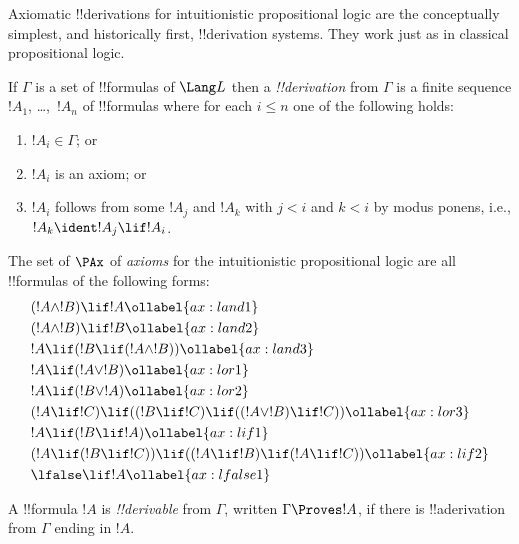 \documentclass[../../../include/open-logic-section]{subfiles}
\begin{document}


Axiomatic !!{derivation}s for intuitionistic propositional logic are
the conceptually simplest, and historically first, !!{derivation}
systems. They work just as in classical propositional logic.

\begin{defn}[!!^{derivability}]
If $\Gamma$ is a set of !!{formula}s of $\Lang L$ then a
\emph{!!{derivation}} from $\Gamma$ is a finite sequence $!A_1$,
\dots,~$!A_n$ of !!{formula}s where for each $i \le n$ one of the
following holds:
\begin{enumerate}
\item $!A_i \in \Gamma$; or
\item $!A_i$ is an axiom; or
\item $!A_i$ follows from some $!A_j$ and $!A_k$ with $j < i$ and $k <
  i$ by modus ponens, i.e., $!A_k \ident !A_j \lif !A_i$.
\end{enumerate}
\end{defn}

\begin{defn}[Axioms]
The set of $\PAx$ of \emph{axioms} for the intuitionistic propositional logic 
are all !!{formula}s of the following forms:
\begin{align}
  & (!A \land !B) \lif !A \ollabel{ax:land1}\\
  & (!A \land !B) \lif !B \ollabel{ax:land2}\\
  & !A \lif (!B \lif (!A \land !B)) \ollabel{ax:land3}\\
  & !A \lif (!A \lor !B) \ollabel{ax:lor1}\\
  & !A \lif (!B \lor !A) \ollabel{ax:lor2}\\
  & (!A \lif !C) \lif ((!B \lif !C) \lif ((!A \lor !B) \lif !C)) \ollabel{ax:lor3}\\
  & !A \lif (!B \lif !A) \ollabel{ax:lif1}\\
  & (!A \lif (!B \lif !C)) \lif ((!A \lif !B) \lif (!A \lif !C)) \ollabel{ax:lif2}\\
  & \lfalse \lif !A \ollabel{ax:lfalse1}\\
\end{align}
\end{defn}

\begin{defn}[!!^{derivability}]
A !!{formula} $!A$ is \emph{!!{derivable}} from $\Gamma$, written
$\Gamma \Proves !A$, if there is !!a{derivation} from $\Gamma$ ending
in $!A$.
\end{defn}
\end{document}
